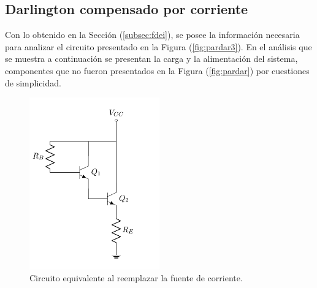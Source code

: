 \subsection{Darlington compensado por corriente}
Con lo obtenido en la Sección (\ref{subsec:fdei}), se posee la información necesaria para analizar el circuito presentado en la Figura (\ref{fig:pardar3}). En el análisis que se muestra a continuación se presentan la carga y la alimentación del sistema, componentes que no fueron presentados en la Figura (\ref{fig:pardar}) por cuestiones de simplicidad.
\begin{figure}[H]
\centering
	\includegraphics[width=0.5\textwidth, page=5]{Imagenes/ParDarlington.pdf}
	\caption{Circuito equivalente al reemplazar la fuente de corriente.}
	\label{fig:pardar4}
\end{figure}

